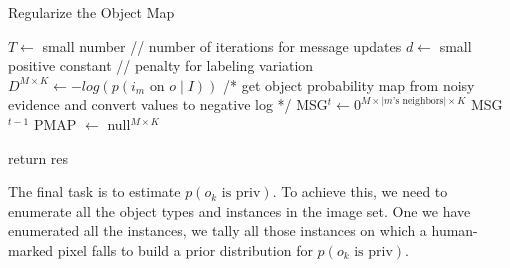 \documentclass[11pt]{article}
\begin{document}
\begin{algorithm}[h!]\label{alg:regObjMap}
\caption{Regularize the Object Map}

$T \leftarrow$ small number // number of iterations for message updates\;
$d \leftarrow$ small positive constant // penalty for labeling variation\;
$D^{M \times K} \leftarrow -log(p(i_m \textrm{ on } o \mid I))$ /* get object probability map from noisy evidence and convert values to negative log */\;
MSG$^t \leftarrow 0^{M \times \lvert m\textrm{'s neighbors} \rvert \times K}$\;
MSG$^{t-1}$\;
PMAP $\leftarrow$ null$^{M \times K}$\;



return res\;
\end{algorithm}


The final task is to estimate $p(o_k \textrm{ is priv})$.  To achieve this, we need to enumerate all the object types and instances in the image set.  One we have enumerated all the instances, we tally all those instances on which a human-marked pixel falls to build a prior distribution for $p(o_k \textrm{ is priv})$.
\end{document}
